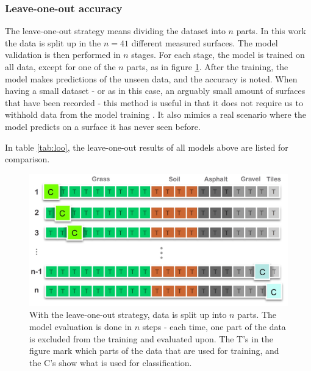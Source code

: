 \subsubsection{Leave-one-out accuracy}
The leave-one-out strategy means dividing the dataset into $n$ parts. In this work the data is split up in the $n=41$ different measured surfaces. The model validation is then performed in $n$ stages. For each stage, the model is trained on all data, except for one of the $n$ parts, as in figure \ref{fig:loo}. After the training, the model makes predictions of the unseen data, and the accuracy is noted. When having a small dataset - or as in this case, an arguably small amount of surfaces that have been recorded - this method is useful in that it does not require us to withhold data from the model training \citep{raschka}. It also mimics a real scenario where the model predicts on a surface it has never seen before.

In table \ref{tab:loo}, the leave-one-out results of all models above are listed for comparison.

\begin{figure}[h]
	\centering
	\includegraphics[scale=0.3]{figs_temp/loo.jpg}
	\caption{With the leave-one-out strategy, data is split up into $n$ parts. The model evaluation is done in $n$ steps - each time, one part of the data is excluded from the training and evaluated upon. The T's in the figure mark which parts of the data that are used for training, and the C's show what is used for classification.}
	\label{fig:loo}
\end{figure}










